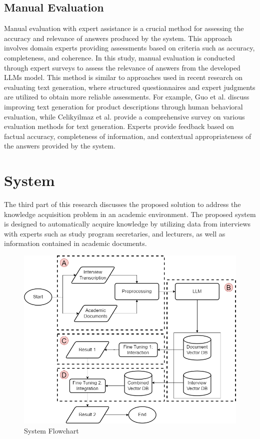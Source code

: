 \documentclass[runningheads]{llncs}
\begin{document}
\subsection{Manual Evaluation}
Manual evaluation with expert assistance is a crucial method for assessing the accuracy and relevance of answers produced by the system. This approach involves domain experts providing assessments based on criteria such as accuracy, completeness, and coherence. In this study, manual evaluation is conducted through expert surveys to assess the relevance of answers from the developed LLMs model. This method is similar to approaches used in recent research on evaluating text generation, where structured questionnaires and expert judgments are utilized to obtain more reliable assessments. For example, Guo et al. \cite{Guo2024} discuss improving text generation for product descriptions through human behavioral evaluation, while Celikyilmaz et al. \cite{Celikyilmaz2020} provide a comprehensive survey on various evaluation methods for text generation. Experts provide feedback based on factual accuracy, completeness of information, and contextual appropriateness of the answers provided by the system.

\section{System}
The third part of this research discusses the proposed solution to address the knowledge acquisition problem in an academic environment. The proposed system is designed to automatically acquire knowledge by utilizing data from interviews with experts such as study program secretaries, and lecturers, as well as information contained in academic documents. 

\begin{figure}
    \centerline{\includegraphics[scale=0.3]{eng-main.png}}
    \caption{System Flowchart}
    \label{fig:main-flowchart}
\end{figure}
\end{document}
